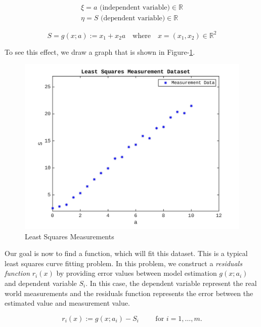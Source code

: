 \documentclass[a4paper]{report}
\numberwithin{figure}{section}
\newcommand{\R}{\mathbb{R}}
\begin{document}
\begin{gather}
\xi = a \text{ (independent variable)} \in \R \\
\eta = S \text{ (dependent variable)} \in \R
\label{eq:lsq_model_variables}
\end{gather}

\begin{equation}
S = g(x;a) := x_1 + x_2a \quad 
\text{where} \quad 
x=(x_1,x_2) \in \R^2
\label{eq}
\end{equation}


To see this effect, 
we draw a graph that is shown in
Figure-\ref{fig:lsq_curve_fit_measurements}.

\begin{figure}[H]
	\centering
	\includegraphics[width=\linewidth,natwidth=640,natheight=640]
{fig/lsq_curve_fit_measurements_v2.jpg}
	\caption{Least Squares Measurements}
	\label{fig:lsq_curve_fit_measurements}
\end{figure}


Our goal is now to find a function, which will fit this
dataset. This is a typical least squares curve fitting problem.
In this problem, we construct a \textit{residuals function} $r_i(x)$ by providing
error values between model estimation $g(x;a_i)$ and dependent
variable $S_i$. In this case, the dependent variable 
represent the real world
measurements and the residuals function represents the error between the estimated value and measurement value. 

\begin{equation}
r_i(x) := g(x;a_i) - S_i \qquad \text{ for }  i = 1,\dots,m.
\label{eq:}
\end{equation}
\end{document}
